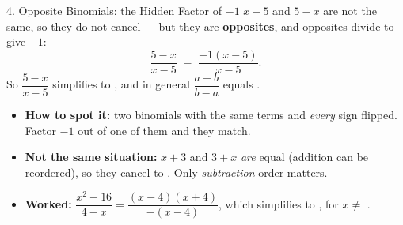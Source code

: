 \documentclass[10pt]{article}
\begin{document}
\begin{notesbox}{4. Opposite Binomials: the Hidden Factor of $-1$}
$x-5$ and $5-x$ are not the same, so they do not cancel --- but they are \textbf{opposites}, and
opposites divide to give $-1$:
\[
  \frac{5-x}{x-5} \;=\; \frac{-1(x-5)}{x-5} .
\]
So $\dfrac{5-x}{x-5}$ simplifies to , and in general $\dfrac{a-b}{b-a}$ equals
.
\begin{itemize}[leftmargin=1.5em, itemsep=3pt]
  \item \textbf{How to spot it:} two binomials with the same terms and \emph{every} sign flipped.
        Factor $-1$ out of one of them and they match.
  \item \textbf{Not the same situation:} $x+3$ and $3+x$ \emph{are} equal (addition can be reordered),
        so they cancel to . Only \emph{subtraction} order matters.
  \item \textbf{Worked:} $\dfrac{x^2-16}{4-x}=\dfrac{(x-4)(x+4)}{-(x-4)}$, which simplifies to
        , \; for $x\neq$ .
\end{itemize}
\end{notesbox}
\end{document}
